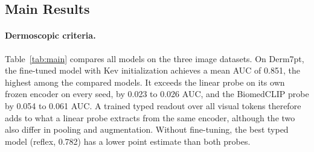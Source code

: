 \documentclass{article}
\begin{document}
\subsection{Main Results}
\begin{table}[t]
\centering
\caption{Official test results. AUC and ECE are averaged over the seven criteria for Derm7pt and computed over pooled yes/no questions for SLAKE and VQA-RAD. Fine-tuned and probe rows give the mean $\pm$ standard deviation over three seeds; a probe seed changes only the cross-validation folds. Zero-shot rows are single deterministic runs.}
\label{tab:main}
\small
\setlength{\tabcolsep}{4pt}
\end{table}

\paragraph{Dermoscopic criteria.} Table~\ref{tab:main} compares all models on the three image datasets. On Derm7pt, the fine-tuned model with Kev initialization achieves a mean AUC of 0.851, the highest among the compared models. It exceeds the linear probe on its own frozen encoder on every seed, by 0.023 to 0.026 AUC, and the BiomedCLIP probe by 0.054 to 0.061 AUC. A trained typed readout over all visual tokens therefore adds to what a linear probe extracts from the same encoder, although the two also differ in pooling and augmentation. Without fine-tuning, the best typed model (reflex, 0.782) has a lower point estimate than both probes.
\end{document}
